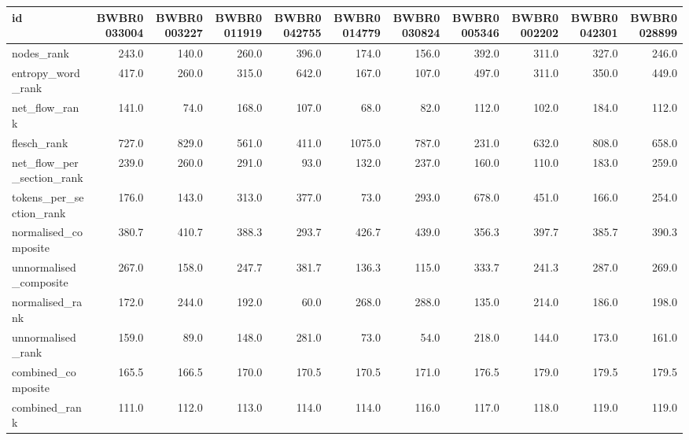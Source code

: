 \begin{tabular}{lrrrrrrrrrr}
\toprule
id & BWBR0033004 & BWBR0003227 & BWBR0011919 & BWBR0042755 & BWBR0014779 & BWBR0030824 & BWBR0005346 & BWBR0002202 & BWBR0042301 & BWBR0028899 \\
\midrule
nodes\_rank & 243.0 & 140.0 & 260.0 & 396.0 & 174.0 & 156.0 & 392.0 & 311.0 & 327.0 & 246.0 \\
\cline{1-11}
entropy\_word\_rank & 417.0 & 260.0 & 315.0 & 642.0 & 167.0 & 107.0 & 497.0 & 311.0 & 350.0 & 449.0 \\
\cline{1-11}
net\_flow\_rank & 141.0 & 74.0 & 168.0 & 107.0 & 68.0 & 82.0 & 112.0 & 102.0 & 184.0 & 112.0 \\
\cline{1-11}
flesch\_rank & 727.0 & 829.0 & 561.0 & 411.0 & 1075.0 & 787.0 & 231.0 & 632.0 & 808.0 & 658.0 \\
\cline{1-11}
net\_flow\_per\_section\_rank & 239.0 & 260.0 & 291.0 & 93.0 & 132.0 & 237.0 & 160.0 & 110.0 & 183.0 & 259.0 \\
\cline{1-11}
tokens\_per\_section\_rank & 176.0 & 143.0 & 313.0 & 377.0 & 73.0 & 293.0 & 678.0 & 451.0 & 166.0 & 254.0 \\
\cline{1-11}
normalised\_composite & 380.7 & 410.7 & 388.3 & 293.7 & 426.7 & 439.0 & 356.3 & 397.7 & 385.7 & 390.3 \\
\cline{1-11}
unnormalised\_composite & 267.0 & 158.0 & 247.7 & 381.7 & 136.3 & 115.0 & 333.7 & 241.3 & 287.0 & 269.0 \\
\cline{1-11}
normalised\_rank & 172.0 & 244.0 & 192.0 & 60.0 & 268.0 & 288.0 & 135.0 & 214.0 & 186.0 & 198.0 \\
\cline{1-11}
unnormalised\_rank & 159.0 & 89.0 & 148.0 & 281.0 & 73.0 & 54.0 & 218.0 & 144.0 & 173.0 & 161.0 \\
\cline{1-11}
combined\_composite & 165.5 & 166.5 & 170.0 & 170.5 & 170.5 & 171.0 & 176.5 & 179.0 & 179.5 & 179.5 \\
\cline{1-11}
combined\_rank & 111.0 & 112.0 & 113.0 & 114.0 & 114.0 & 116.0 & 117.0 & 118.0 & 119.0 & 119.0 \\
\cline{1-11}
\bottomrule
\end{tabular}
